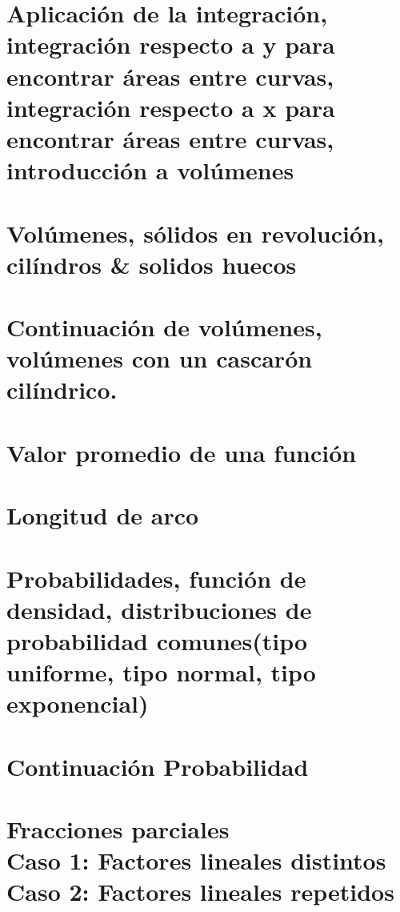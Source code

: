 \documentclass[openany]{book}
\begin{document}
\chapter{Aplicación de la integración, integración respecto a y para encontrar áreas entre curvas, integración respecto a x para encontrar áreas entre curvas, introducción a \textbf{volúmenes}}



\chapter{Volúmenes, sólidos en revolución, cilíndros \& solidos huecos}


\chapter{Continuación de volúmenes, volúmenes con un cascarón cilíndrico.}



\chapter{Valor promedio de una función}


\chapter{Longitud de arco}


\chapter{Probabilidades, función de densidad, distribuciones de probabilidad comunes(tipo uniforme, tipo normal, tipo exponencial)}


\chapter{Continuación Probabilidad}


\chapter{Fracciones parciales \\ Caso 1: Factores lineales distintos \\ Caso 2: Factores lineales repetidos}

\end{document}
